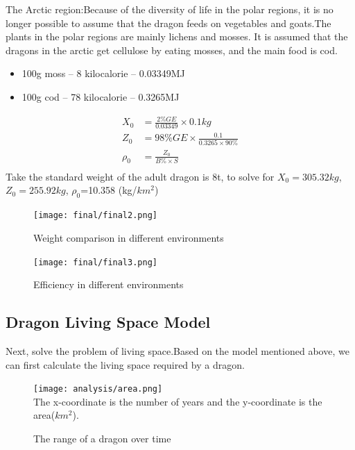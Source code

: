 The Arctic region:Because of the diversity of life in the polar regions, it is no longer possible to assume that the dragon feeds on vegetables and goats.The plants in the polar regions are mainly lichens and mosses. It is assumed that the dragons in the arctic get cellulose by eating mosses, and the main food is cod.

\begin{itemize}
    \item 100g moss -- 8 kilocalorie -- 0.03349MJ \cite{food1}
    \item 100g cod -- 78 kilocalorie -- 0.3265MJ \cite{food2}
\end{itemize}
\begin{align*}
X_0 &=\frac{2\%GE}{0.03349} \times 0.1 kg \\
Z_0 &=98\%GE \times\frac{0.1}{0.3265 \times 90\%} \\
\rho_0&=\frac{Z_0}{B\%\times S} \\
\end{align*}
Take the standard weight of the adult dragon is 8t, to solve for $X_0=305.32kg$, $Z_0=255.92kg$, $\rho_0$=10.358 (kg/$km^2$)

\begin{figure}
    \centering
    \texttt{[image: final/final2.png]}
    \caption{Weight comparison in different environments}
    \label{fig:diff_env_weight}
\end{figure}

\begin{figure}
    \centering
    \texttt{[image: final/final3.png]}
    \caption{Efficiency in different environments}
    \label{fig:diff_env_spirit}
\end{figure}

\subsection{Dragon Living Space Model}

Next, solve the problem of living space.Based on the model mentioned above, we can first calculate the living space required by a dragon.

\begin{figure}[h]
    \centering
    \texttt{[image: analysis/area.png]}\\
    The x-coordinate is the number of years and the y-coordinate is the area($km^2$).
    \caption{The range of a dragon over time}
    \label{fig:area}
\end{figure}

